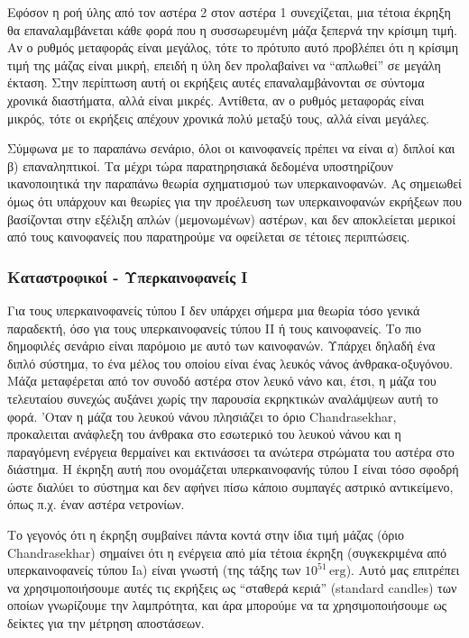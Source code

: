 Εφόσον η ροή ύλης από τον αστέρα 2 στον αστέρα 1 συνεχίζεται, μια τέτοια έκρηξη θα επαναλαμβάνεται κάθε φορά που η συσσωρευμένη μάζα ξεπερνά την κρίσιμη τιμή. Αν ο ρυθμός μεταφοράς είναι μεγάλος, τότε το πρότυπο αυτό προβλέπει ότι η κρίσιμη τιμή της μάζας είναι μικρή, επειδή η ύλη δεν προλαβαίνει να ``απλωθεί'' σε μεγάλη έκταση. Στην περίπτωση αυτή οι εκρήξεις αυτές επαναλαμβάνονται σε σύντομα χρονικά διαστήματα, αλλά είναι μικρές. Αντίθετα, αν ο ρυθμός μεταφοράς είναι μικρός, τότε οι εκρήξεις απέχουν χρονικά πολύ μεταξύ τους, αλλά είναι μεγάλες.

Σύμφωνα με το παραπάνω σενάριο, όλοι οι καινοφανείς πρέπει να είναι α) διπλοί και β) επαναληπτικοί. Τα μέχρι τώρα παρατηρησιακά δεδομένα υποστηρίζουν ικανοποιητικά την παραπάνω θεωρία σχηματισμού των υπερκαινοφανών. Ας σημειωθεί όμως ότι υπάρχουν και θεωρίες για την προέλευση των υπερκαινοφανών εκρήξεων που βασίζονται στην εξέλιξη απλών (μεμονωμένων) αστέρων, και δεν αποκλείεται μερικοί από τους καινοφανείς που παρατηρούμε να οφείλεται σε τέτοιες περιπτώσεις.

\subsubsection{Καταστροφικοί - Υπερκαινοφανείς I}
Για τους υπερκαινοφανείς τύπου I δεν υπάρχει σήμερα μια θεωρία τόσο γενικά παραδεκτή, όσο για τους υπερκαινοφανείς τύπου II ή τους καινοφανείς. Το πιο δημοφιλές σενάριο είναι παρόμοιο με αυτό των καινοφανών. Υπάρχει δηλαδή ένα διπλό σύστημα, το ένα μέλος του οποίου είναι ένας λευκός νάνος άνθρακα-οξυγόνου. Μάζα μεταφέρεται από τον συνοδό αστέρα στον λευκό νάνο και, έτσι, η μάζα του τελευταίου συνεχώς αυξάνει χωρίς την παρουσία εκρηκτικών αναλάμψεων αυτή το φορά. 'Οταν η μάζα του λευκού νάνου πλησιάζει το όριο Chandrasekhar, προκαλειται ανάφλεξη του άνθρακα στο εσωτερικό του λευκού νάνου και η παραγόμενη ενέργεια  θερμαίνει και εκτινάσσει τα ανώτερα στρώματα του αστέρα στο διάστημα. Η έκρηξη αυτή που ονομάζεται υπερκαινοφανής τύπου I είναι τόσο σφοδρή ώστε διαλύει το σύστημα και δεν αφήνει πίσω κάποιο συμπαγές αστρικό αντικείμενο, όπως π.χ. έναν αστέρα νετρονίων.

Το γεγονός ότι η έκρηξη συμβαίνει πάντα κοντά στην ίδια τιμή μάζας (όριο Chandrasekhar) σημαίνει ότι η ενέργεια από μία τέτοια έκρηξη (συγκεκριμένα από υπερκαινοφανείς τύπου Ia) είναι γνωστή (της τάξης των $10^{51}\,\text{erg}$). Αυτό μας επιτρέπει να χρησιμοποιήσουμε αυτές τις εκρήξεις ως ``σταθερά κεριά'' (standard candles) των οποίων γνωρίζουμε την λαμπρότητα, και άρα μπορούμε να τα χρησιμοποιήσουμε ως δείκτες για την μέτρηση αποστάσεων.


